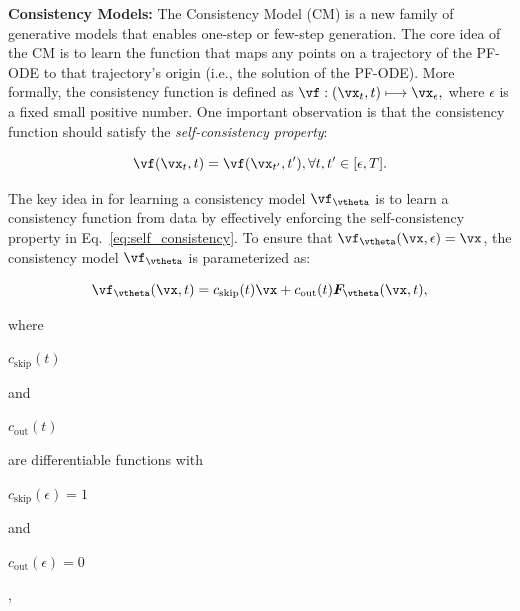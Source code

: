 \documentclass{article} %
\newcommand{\jian}[1]{\textcolor{red}{#1}}
\begin{document}
\vspace{0.1cm}

\noindent
{\bf Consistency Models:}
The Consistency Model (CM) \citep{song2023consistency} is a new family of generative models that enables one-step or few-step generation. The core idea of the CM is to learn the function that maps any points on a trajectory of the PF-ODE to that trajectory's origin (i.e., the solution of the PF-ODE). More formally, the consistency function is defined as
$
    \vf:(\vx_t,t)\longmapsto \vx_\epsilon,
$
where $\epsilon$ is a fixed small positive number. 
One important observation is that the consistency function should satisfy the 
{\em self-consistency property}:
\begin{small}
\begin{equation}
    \vf(\vx_t,t)=\vf(\vx_{t'},t'),\forall t,t'\in[\epsilon,T]. \label{eq:self_consistency}
\end{equation}
\end{small}
The key idea in \citep{song2023consistency} for learning a consistency model $\vf_\vtheta$ is to learn a consistency function from data by effectively enforcing the self-consistency property in Eq.~\ref{eq:self_consistency}. 
To ensure that $\vf_\vtheta(\vx,\epsilon)=\vx$, 
the consistency model $\vf_\vtheta$ is parameterized as:
\begin{small}
\begin{equation}
    \vf_\vtheta(\vx,t)=c_{\text{skip}}(t)\vx+c_{\text{out}}(t)\boldsymbol{F}_\vtheta(\vx,t),
\end{equation}
\end{small}
where \begin{small}$c_{\text{skip}}(t)$\end{small} and \begin{small}$c_{\text{out}}(t)$\end{small} are differentiable functions with \begin{small}$c_{\text{skip}}(\epsilon)=1$\end{small} and \begin{small}$c_{\text{out}}(\epsilon)=0$\end{small},
\end{document}
